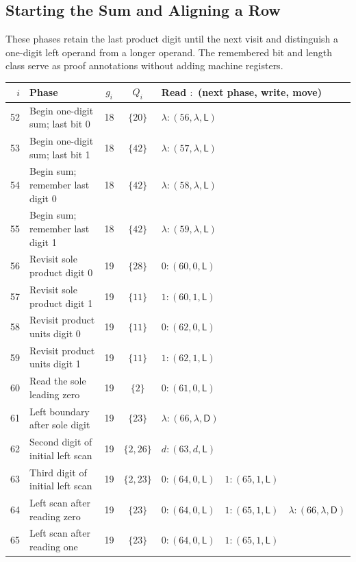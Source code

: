 \documentclass[11pt,a4paper]{article}
\newcommand{\blank}{\lambda}
\newcommand{\triple}[3]{(#1,#2,\mathsf{#3})}
\begin{document}
\newpage
\subsection{Starting the Sum and Aligning a Row}\label{sec:part5}
These phases retain the last product digit until the next visit and
distinguish a one-digit left operand from a longer operand. The remembered
bit and length class serve as proof annotations without adding machine registers.

\begin{center}
\fontsize{9.2}{11}\selectfont\renewcommand{\arraystretch}{1.21}
\setlength{\tabcolsep}{4pt}
\begin{tabularx}{\textwidth}{r p{5.5cm} c c X}
\toprule\rowcolor{Pale}$i$ & Phase & $g_i$ & $Q_i$ & Read $:$ (next phase, write, move)\\\midrule
52 & Begin one-digit sum; last bit 0 & 18 & $\{20\}$ & $\blank:\triple{56}{\blank}{L}$ \\
53 & Begin one-digit sum; last bit 1 & 18 & $\{42\}$ & $\blank:\triple{57}{\blank}{L}$ \\
54 & Begin sum; remember last digit 0 & 18 & $\{42\}$ & $\blank:\triple{58}{\blank}{L}$ \\
55 & Begin sum; remember last digit 1 & 18 & $\{42\}$ & $\blank:\triple{59}{\blank}{L}$ \\
56 & Revisit sole product digit 0 & 19 & $\{28\}$ & $0:\triple{60}{0}{L}$ \\
57 & Revisit sole product digit 1 & 19 & $\{11\}$ & $1:\triple{60}{1}{L}$ \\
58 & Revisit product units digit 0 & 19 & $\{11\}$ & $0:\triple{62}{0}{L}$ \\
59 & Revisit product units digit 1 & 19 & $\{11\}$ & $1:\triple{62}{1}{L}$ \\
60 & Read the sole leading zero & 19 & $\{2\}$ & $0:\triple{61}{0}{L}$ \\
61 & Left boundary after sole digit & 19 & $\{23\}$ & $\blank:\triple{66}{\blank}{D}$ \\
62 & Second digit of initial left scan & 19 & $\{2,26\}$ & $d:\triple{63}{d}{L}$ \\
63 & Third digit of initial left scan & 19 & $\{2,23\}$ & $0:\triple{64}{0}{L}\quad 1:\triple{65}{1}{L}$ \\
64 & Left scan after reading zero & 19 & $\{23\}$ & $0:\triple{64}{0}{L}\quad 1:\triple{65}{1}{L}\quad \blank:\triple{66}{\blank}{D}$ \\
65 & Left scan after reading one & 19 & $\{23\}$ & $0:\triple{64}{0}{L}\quad 1:\triple{65}{1}{L}$ \\

\end{tabularx}
\end{center}
\end{document}
